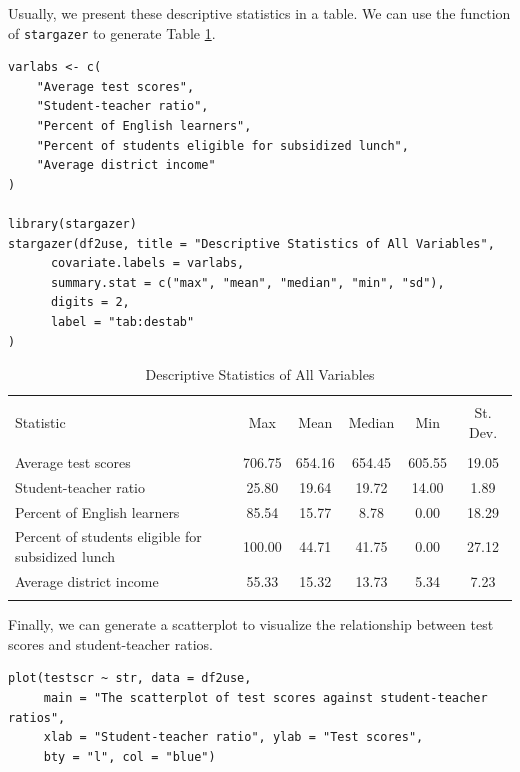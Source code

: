 \documentclass[11pt]{article}
\begin{document}
Usually, we present these descriptive statistics in a table. We can
use the function of \texttt{stargazer} to generate Table \ref{tab:destab}.
\begin{verbatim}
varlabs <- c(
    "Average test scores",
    "Student-teacher ratio",
    "Percent of English learners",
    "Percent of students eligible for subsidized lunch",
    "Average district income"
)

library(stargazer)
stargazer(df2use, title = "Descriptive Statistics of All Variables",
	  covariate.labels = varlabs,
	  summary.stat = c("max", "mean", "median", "min", "sd"),
	  digits = 2,
	  label = "tab:destab"
)
\end{verbatim}


\begin{table}[!htbp] \centering
  \caption{Descriptive Statistics of All Variables}
  \label{tab:destab}
\begin{tabular}{@{\extracolsep{5pt}}lccccc}
\\[-1.8ex]\hline
\hline \\[-1.8ex]
Statistic & \multicolumn{1}{c}{Max} & \multicolumn{1}{c}{Mean} & \multicolumn{1}{c}{Median} & \multicolumn{1}{c}{Min} & \multicolumn{1}{c}{St. Dev.} \\
\hline \\[-1.8ex]
Average test scores & 706.75 & 654.16 & 654.45 & 605.55 & 19.05 \\
Student-teacher ratio & 25.80 & 19.64 & 19.72 & 14.00 & 1.89 \\
Percent of English learners & 85.54 & 15.77 & 8.78 & 0.00 & 18.29 \\
Percent of students eligible for subsidized lunch & 100.00 & 44.71 & 41.75 & 0.00 & 27.12 \\
Average district income & 55.33 & 15.32 & 13.73 & 5.34 & 7.23 \\
\hline \\[-1.8ex]
\end{tabular}
\end{table}

Finally, we can generate a scatterplot to visualize the relationship
between test scores and student-teacher ratios.

\begin{verbatim}
plot(testscr ~ str, data = df2use,
     main = "The scatterplot of test scores against student-teacher ratios",
     xlab = "Student-teacher ratio", ylab = "Test scores",
     bty = "l", col = "blue")
\end{verbatim}
\end{document}
